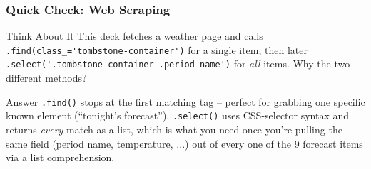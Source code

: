 \begin{frame}[fragile]\frametitle{Quick Check: Web Scraping}
\begin{block}{Think About It}
This deck fetches a weather page and calls \lstinline|.find(class_='tombstone-container')| for
a single item, then later \lstinline|.select('.tombstone-container .period-name')| for
\emph{all} items. Why the two different methods?
\end{block}
\pause
\begin{block}{Answer}
\lstinline|.find()| stops at the first matching tag -- perfect for grabbing one specific known
element (``tonight's forecast''). \lstinline|.select()| uses CSS-selector syntax and returns
\emph{every} match as a list, which is what you need once you're pulling the same field (period
name, temperature, ...) out of every one of the 9 forecast items via a list comprehension.
\end{block}
\end{frame}















